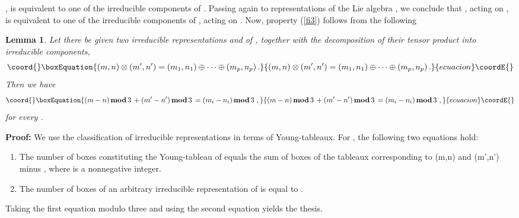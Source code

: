 \documentclass[a4paper,12pt]{article}
\newtheorem{lemma}{Lemma}
\begin{document}
\coordHE{}, is equivalent to one of the irreducible
components of \coordHE{}. Passing again to
representations of the Lie algebra \coordHE{}, we conclude that \coordHE{}, acting on \coordHE{}, is equivalent to one of the
irreducible components of \coordHE{},
acting on \coordHE{}. Now,
property (\ref{fi3}) follows from the following
\begin{lemma}
Let there be given two irreducible representations \coordHE{} and
\coordHE{} of \coordHE{}, together with the decomposition of their
tensor product into irreducible components,
\begin{equation}\coord{}\boxEquation{
(m,n) \otimes (m',n') = (m_1,n_1) \oplus \dots \oplus (m_p,n_p) \,
.
}{
(m,n) \otimes (m',n') = (m_1,n_1) \oplus \dots \oplus (m_p,n_p) \,
.
}{ecuacion}\coordE{}\end{equation}
Then we have
\begin{equation}\coord{}\boxEquation{
(m - n)  \, \mbox{\rm \bf mod} \, 3 \, + (m' - n')  \, \mbox{\rm
\bf mod} \, 3 \, = (m_i - n_i)  \, \mbox{\rm \bf mod} \, 3 \,\, ,
}{
(m - n)  \, \mbox{\rm \bf mod} \, 3 \, + (m' - n')  \, \mbox{\rm
\bf mod} \, 3 \, = (m_i - n_i)  \, \mbox{\rm \bf mod} \, 3 \,\, ,
}{ecuacion}\coordE{}\end{equation}
for every \coordHE{}.
\end{lemma}

{\bf Proof:} We use the classification of irreducible
representations in terms of Young-tableaux. For \coordHE{}, the
following two equations hold:
\begin{enumerate}
\item
The number of boxes constituting the Young-tableau of \coordHE{}
equals the sum of boxes of the tableaux corresponding to (m,n) and
(m',n') minus \coordHE{}, where \coordHE{} is a nonnegative integer.
\item
The number of boxes of an arbitrary irreducible representation of
\coordHE{} is equal to \coordHE{}.
\end{enumerate}
Taking the first equation modulo three and using the second
equation yields the thesis.
\end{document}
